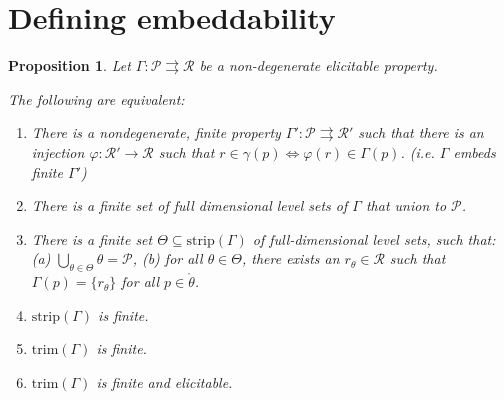 \documentclass[12pt]{article}
\renewcommand{\P}{\mathcal{P}}
\newcommand{\R}{\mathcal{R}}
\newcommand{\inter}[1]{\mathring{#1}}%
\newcommand{\toto}{\rightrightarrows}
\newcommand{\trim}{\mathrm{trim}}
\newcommand{\strip}{\mathrm{strip}}
\newtheorem{proposition}{Proposition}
\begin{document}
%
%
%
%
%




\section{Defining embeddability}


\begin{proposition}\label{prop:optimal-reports-per-level-set}
  Let $\Gamma:\P\toto\R$ be a non-degenerate elicitable property.

  The following are equivalent:
  \begin{enumerate}
  \item There is a nondegenerate, finite property $\Gamma':\P\toto\R'$ such that there is an injection $\varphi:\R'\to\R$ such that $r\in\gamma(p) \iff \varphi(r) \in \Gamma(p)$. (i.e. $\Gamma$ embeds finite $\Gamma'$)
  \item There is a finite set of full dimensional level sets of $\Gamma$ that union to $\P$.
  \item There is a finite set $\Theta \subseteq \strip(\Gamma)$ of full-dimensional level sets, such that: (a) $\bigcup_{\theta\in\Theta} \theta = \P$, (b) for all $\theta \in \Theta$, there exists an $r_\theta \in \R$ such that $\Gamma(p) = \{r_\theta\}$ for all $p \in \inter{\theta}$.
  \item $\strip(\Gamma)$ is finite.
  \item $\trim(\Gamma)$ is finite.
  \item $\trim(\Gamma)$ is finite and elicitable.

  
  \end{enumerate}
\end{proposition}
\end{document}

